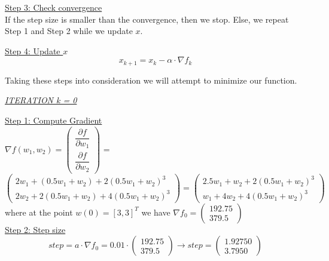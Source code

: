 \underline{Step 3: Check convergence}\\
If the step size is smaller than the convergence, then we stop. Else, we repeat Step 1 and Step 2 while we update $x$.
\vspace{4mm}

\underline{Step 4: Update $x$}
\begin{equation}
	x_{k+1} = x_{k} - \alpha \cdot \nabla f_{k}
\end{equation}
\vspace{4mm}

Taking these steps into consideration we will attempt to minimize our function.\\

\begin{center}
	\underline{\textit{ITERATION k = 0}}
\end{center}

\underline{Step 1: Compute Gradient}\\
\(\nabla f(w_1,w_2) = \left(\begin{array}{c}
	\dfrac{\partial f}{\partial w_1} \\[4mm]
	\dfrac{\partial f}{\partial w_2}
\end{array}\right)\) = $\left(\begin{array}{c}
	2w_1 + (0.5w_1+w_2) + 2(0.5w_1+w_2)^3\\[1mm]
	2w_2 + 2(0.5w_1+w_2) + 4(0.5w_1+w_2)^3
\end{array}\right) = \left(\begin{array}{c}
	2.5w_1 + w_2 + 2(0.5w_1+w_2)^3\\[1mm]
	w_1 + 4w_2 + 4(0.5w_1+w_2)^3
\end{array}\right)$ \\[3mm]

where at the point $w\left(0\right) = \left[3, 3\right]^T$ we have $\nabla f_{0} = \left(\begin{array}{c}
	192.75 \\
	379.5
\end{array}\right)$
\\[4mm]

\underline{Step 2: Step size}
\[
step = a \cdot \nabla f_{0} = 0.01 \cdot \left(\begin{array}{c}
	192.75 \\
	379.5
\end{array}\right) \rightarrow step =\left(\begin{array}{c}
1.92750 \\
3.7950
\end{array}\right)
\]
\\[4mm]


